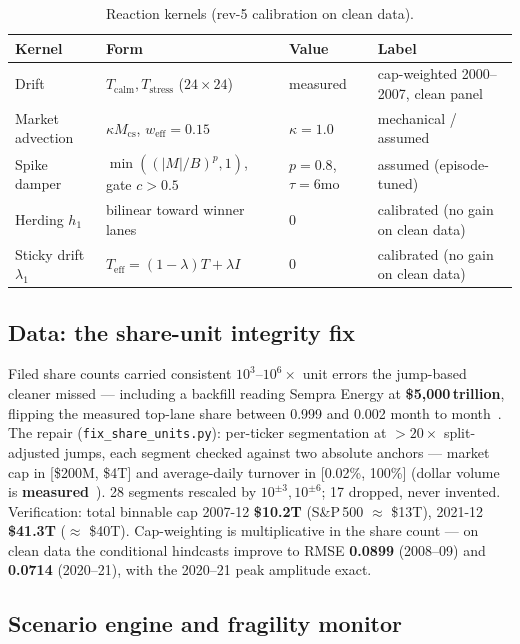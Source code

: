 \documentclass[11pt,a4paper]{article}
\begin{document}
\begin{table}[h]
\centering
\caption{Reaction kernels (rev-5 calibration on clean data).}
\label{tab:kernels}
\begin{tabular}{llll}
\toprule
Kernel & Form & Value & Label \\
\midrule
Drift & $T_{\mathrm{calm}}, T_{\mathrm{stress}}$ ($24\times24$) & measured & cap-weighted 2000--2007, clean panel \\
Market advection & $\kappa M_{\mathrm{cs}}$, $w_{\mathrm{eff}}=0.15$ & $\kappa=1.0$ & mechanical / assumed \\
Spike damper & $\min((|M|/B)^p,1)$, gate $c>0.5$ & $p=0.8$, $\tau=6$mo & assumed (episode-tuned) \\
Herding $h_1$ & bilinear toward winner lanes & 0 & calibrated (no gain on clean data) \\
Sticky drift $\lambda_1$ & $T_{\mathrm{eff}}=(1-\lambda)T+\lambda I$ & 0 & calibrated (no gain on clean data) \\
\bottomrule
\end{tabular}
\end{table}

\subsection{Data: the share-unit integrity fix}
\label{sec:data}

Filed share counts carried consistent $10^3$--$10^6\times$ unit errors the jump-based cleaner missed --- including a backfill reading Sempra Energy at \textbf{\$5{,}000\,trillion}, flipping the measured top-lane share between 0.999 and 0.002 month to month~\cite{sec}. The repair (\texttt{fix\_share\_units.py}): per-ticker segmentation at $>20\times$ split-adjusted jumps, each segment checked against two absolute anchors --- market cap in [\$200M, \$4T] and average-daily turnover in [0.02\%, 100\%] (dollar volume is \textbf{measured}~\cite{yahoo}). 28 segments rescaled by $10^{\pm3}, 10^{\pm6}$; 17 dropped, never invented. Verification: total binnable cap 2007-12 \textbf{\$10.2T} (S\&P\,500 $\approx$ \$13T), 2021-12 \textbf{\$41.3T} ($\approx$ \$40T). Cap-weighting is multiplicative in the share count --- on clean data the conditional hindcasts improve to RMSE \textbf{0.0899} (2008--09) and \textbf{0.0714} (2020--21), with the 2020--21 peak amplitude exact.

\subsection{Scenario engine and fragility monitor}
\end{document}
